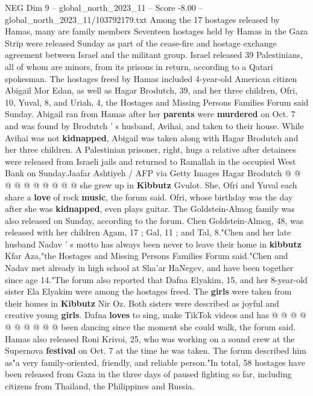 \begin{textsample}{NEG Dim 9 – global\_north\_2023\_11 – Score -8.00 – global\_north\_2023\_11/103792179.txt}  \label{ex:f9_neg_070}
Among the 17 hostages released by Hamas, many are family members Seventeen hostages held by Hamas in the Gaza Strip were released Sunday as part of the cease-fire and hostage exchange agreement between Israel and the militant group.
Israel released 39 Palestinians, all of whom are minors, from its prisons in return, according to a Qatari spokesman.
The hostages freed by Hamas included 4-year-old American citizen Abigail Mor Edan, as well as Hagar Brodutch, 39, and her three children, Ofri, 10, Yuval, 8, and Uriah, 4, the Hostages and Missing Persons Families Forum said Sunday.
Abigail ran from Hamas after her \textbf{parents} were \textbf{murdered} on Oct. 7 and was found by Brodutch ' s husband, Avihai, and taken to their house.
While Avihai was not \textbf{kidnapped}, Abigail was taken along with Hagar Brodutch and her three children.
A Palestinian prisoner, right, hugs a relative after detainees were released from Israeli jails and returned to Ramallah in the occupied West Bank on Sunday.Jaafar Ashtiyeh / AFP via Getty Images Hagar Brodutch @ @ @ @ @ @ @ @ @ @ she grew up in \textbf{Kibbutz} Gvulot.
She, Ofri and Yuval each share a \textbf{love} of rock \textbf{music}, the forum said.
Ofri, whose birthday was the day after she was \textbf{kidnapped}, even plays guitar.
The Goldstein-Almog family was also released on Sunday, according to the forum.
Chen Goldstein-Almog, 48, was released with her children Agam, 17 ; Gal, 11 ; and Tal, 8."Chen and her late husband Nadav ' s motto has always been never to leave their home in \textbf{kibbutz} Kfar Aza,"the Hostages and Missing Persons Families Forum said."Chen and Nadav met already in high school at Sha'ar HaNegev, and have been together since age 14."The forum also reported that Dafna Elyakim, 15, and her 8-year-old sister Ela Elyakim were among the hostages freed.
The \textbf{girls} were taken from their homes in \textbf{Kibbutz} Nir Oz.
Both sisters were described as joyful and creative young \textbf{girls}.
Dafna \textbf{loves} to sing, make TikTok videos and has @ @ @ @ @ @ @ @ @ @ been dancing since the moment she could walk, the forum said.
Hamas also released Roni Krivoi, 25, who was working on a sound crew at the Supernova \textbf{festival} on Oct. 7 at the time he was taken.
The forum described him as"a very family-oriented, friendly, and reliable person."In total, 58 hostages have been released from Gaza in the three days of paused fighting so far, including citizens from Thailand, the Philippines and Russia.

\end{textsample}
